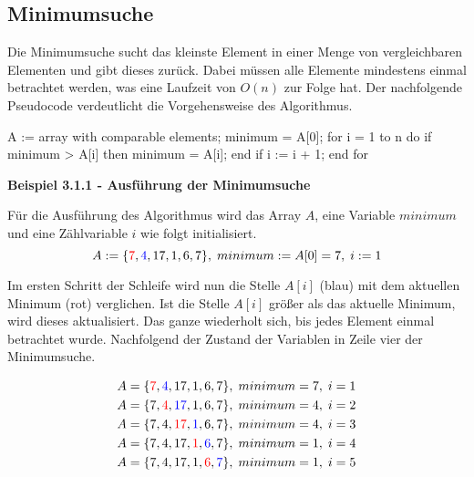 \subsection{Minimumsuche}

Die Minimumsuche sucht das kleinste Element in einer Menge von vergleichbaren Elementen und gibt dieses zurück. Dabei müssen alle Elemente mindestens einmal betrachtet werden, was eine Laufzeit von $O(n)$ zur Folge hat. Der nachfolgende Pseudocode verdeutlicht die Vorgehensweise des Algorithmus.

\begin{PseudoCode}
A := array with comparable elements;
minimum = A[0];
for i = 1 to n do
	if minimum > A[i] then
		minimum = A[i];
	end if
	i := i + 1;
end for
\end{PseudoCode}

\noindent
\textbf{Beispiel 3.1.1 - Ausführung der Minimumsuche}

\noindent
Für die Ausführung des Algorithmus wird das Array $A$, eine Variable $minimum$ und eine Zählvariable $i$ wie folgt initialisiert. 
\begin{equation}
	A := \{\textcolor{red}{7}, \textcolor{blue}{4}, 17, 1, 6, 7\},\;minimum := A[0] = 7,\;i := 1
\end{equation}

\noindent
Im ersten Schritt der Schleife wird nun die Stelle $A[i]$ (blau) mit dem aktuellen Minimum (rot) verglichen. Ist die Stelle $A[i]$ größer als das aktuelle Minimum, wird dieses aktualisiert. Das ganze wiederholt sich, bis jedes Element einmal betrachtet wurde. Nachfolgend der Zustand der Variablen in Zeile vier der Minimumsuche.

\begin{equation}
	\begin{split}
		A = \{\textcolor{red}{7}, \textcolor{blue}{4}, 17, 1, 6, 7\},\;minimum = 7,\;i = 1 \\
		A = \{7, \textcolor{red}{4}, \textcolor{blue}{17}, 1, 6, 7\},\;minimum = 4,\;i = 2 \\
		A = \{7, 4, \textcolor{red}{17}, \textcolor{blue}{1}, 6, 7\},\;minimum = 4,\;i = 3 \\
		A = \{7, 4, 17, \textcolor{red}{1}, \textcolor{blue}{6}, 7\},\;minimum = 1,\;i = 4 \\
		A = \{7, 4, 17, 1, \textcolor{red}{6}, \textcolor{blue}{7}\},\;minimum = 1,\;i = 5 
	\end{split}
\end{equation}

\newpage




